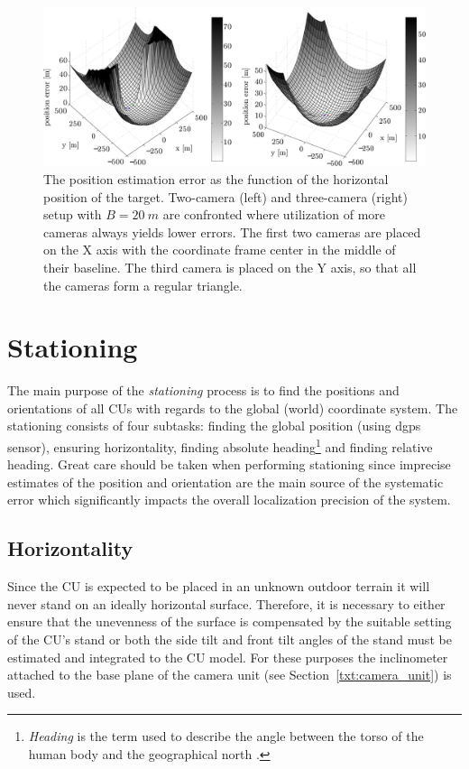 \begin{figure}[!htb]\centering
	\centering
	\includegraphics[width=0.95\linewidth]{fig/2_vs_3_cus.pdf}
	\caption{The position estimation error as the function of the horizontal position of the target. Two-camera (left) and three-camera (right) setup with $B = 20\ m$ are confronted where utilization of more cameras always yields lower errors. The first two cameras are placed on the X axis with the coordinate frame center in the middle of their baseline. The third camera is placed on the Y axis, so that all the cameras form a regular triangle.} 
	\label{fig:errorMapGivenTargetPosition}
\end{figure}


\section{Stationing} \label{txt:stationing}

The main purpose of the \textit{stationing} process is to find the positions and orientations of all CUs with regards to the global (world) coordinate system. The stationing consists of four subtasks: finding the global position (using \gls{dgps} sensor), ensuring horizontality, finding absolute heading\footnote{\textit{Heading} is the term used to describe the angle between the torso of the human body and the geographical north \cite{Henriksson648760}.} and finding relative heading. Great care should be taken when performing stationing since imprecise estimates of the position and orientation are the main source of the systematic error which significantly impacts the overall localization precision of the system.

\subsection{Horizontality}
Since the CU is expected to be placed in an unknown outdoor terrain it will never stand on an ideally horizontal surface. Therefore, it is necessary to either ensure that the unevenness of the surface is compensated by the suitable setting of the CU's stand or both the side tilt and front tilt angles of the stand must be estimated and integrated to the CU model. For these purposes the inclinometer attached to the base plane of the camera unit (see Section~\ref{txt:camera_unit}) is used.

